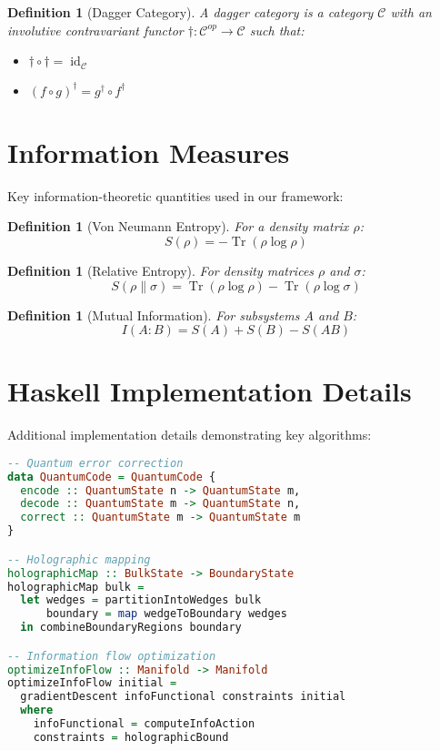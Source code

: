 \documentclass[12pt]{article}
\newtheorem{definition}[theorem]{Definition}
\DeclareMathOperator{\tr}{Tr}
\DeclareMathOperator{\id}{id}
\begin{document}
\begin{definition}[Dagger Category]
A dagger category is a category $\mathcal{C}$ with an involutive contravariant functor $\dagger: \mathcal{C}^{op} \to \mathcal{C}$ such that:
\begin{itemize}
\item $\dagger \circ \dagger = \id_{\mathcal{C}}$
\item $(f \circ g)^\dagger = g^\dagger \circ f^\dagger$
\end{itemize}
\end{definition}

\section{Information Measures}

Key information-theoretic quantities used in our framework:

\begin{definition}[Von Neumann Entropy]
For a density matrix $\rho$:
\begin{equation}
S(\rho) = -\tr(\rho \log \rho)
\end{equation}
\end{definition}

\begin{definition}[Relative Entropy]
For density matrices $\rho$ and $\sigma$:
\begin{equation}
S(\rho \| \sigma) = \tr(\rho \log \rho) - \tr(\rho \log \sigma)
\end{equation}
\end{definition}

\begin{definition}[Mutual Information]
For subsystems $A$ and $B$:
\begin{equation}
I(A:B) = S(A) + S(B) - S(AB)
\end{equation}
\end{definition}

\section{Haskell Implementation Details}

Additional implementation details demonstrating key algorithms:

\begin{lstlisting}[language=Haskell]
-- Quantum error correction
data QuantumCode = QuantumCode {
  encode :: QuantumState n -> QuantumState m,
  decode :: QuantumState m -> QuantumState n,
  correct :: QuantumState m -> QuantumState m
}

-- Holographic mapping
holographicMap :: BulkState -> BoundaryState
holographicMap bulk = 
  let wedges = partitionIntoWedges bulk
      boundary = map wedgeToBoundary wedges
  in combineBoundaryRegions boundary

-- Information flow optimization
optimizeInfoFlow :: Manifold -> Manifold
optimizeInfoFlow initial = 
  gradientDescent infoFunctional constraints initial
  where
    infoFunctional = computeInfoAction
    constraints = holographicBound
\end{lstlisting}
\end{document}
